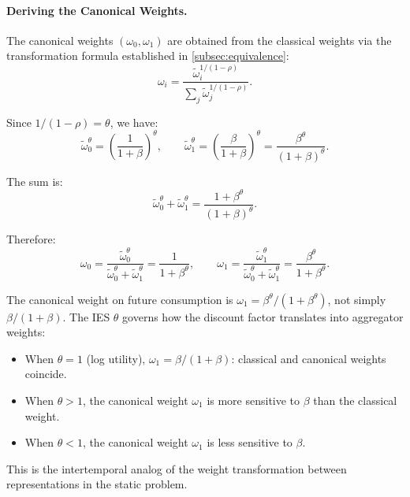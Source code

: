 \paragraph{Deriving the Canonical Weights.}
The canonical weights $(\omega_0, \omega_1)$ are obtained from the classical weights via the transformation formula established in \cref{subsec:equivalence}:
\begin{equation}
\omega_i = \frac{\tilde{\omega}_i^{1/(1-\rho)}}{\sum_{j} \tilde{\omega}_j^{1/(1-\rho)}}.
\label{eq:weight-transform-inter}
\end{equation}

Since $1/(1-\rho) = \theta$, we have:
\begin{equation}
\tilde{\omega}_0^{\theta} = \left( \frac{1}{1+\beta} \right)^{\theta}, \qquad \tilde{\omega}_1^{\theta} = \left( \frac{\beta}{1+\beta} \right)^{\theta} = \frac{\beta^{\theta}}{(1+\beta)^{\theta}}.
\label{eq:weight-transform-calc}
\end{equation}

The sum is:
\begin{equation}
\tilde{\omega}_0^{\theta} + \tilde{\omega}_1^{\theta} = \frac{1 + \beta^{\theta}}{(1+\beta)^{\theta}}.
\label{eq:weight-sum}
\end{equation}

Therefore:
\begin{equation}
\omega_0 = \frac{\tilde{\omega}_0^{\theta}}{\tilde{\omega}_0^{\theta} + \tilde{\omega}_1^{\theta}} = \frac{1}{1 + \beta^{\theta}}, \qquad \omega_1 = \frac{\tilde{\omega}_1^{\theta}}{\tilde{\omega}_0^{\theta} + \tilde{\omega}_1^{\theta}} = \frac{\beta^{\theta}}{1 + \beta^{\theta}}.
\label{eq:canonical-weights-final}
\end{equation}

\begin{calloutnote}
The canonical weight on future consumption is $\omega_1 = \beta^{\theta}/(1+\beta^{\theta})$, not simply $\beta/(1+\beta)$. The IES $\theta$ governs how the discount factor translates into aggregator weights:
\begin{itemize}[nosep]
\item When $\theta = 1$ (log utility), $\omega_1 = \beta/(1+\beta)$: classical and canonical weights coincide.
\item When $\theta > 1$, the canonical weight $\omega_1$ is more sensitive to $\beta$ than the classical weight.
\item When $\theta < 1$, the canonical weight $\omega_1$ is less sensitive to $\beta$.
\end{itemize}
This is the intertemporal analog of the weight transformation between representations in the static problem.
\end{calloutnote}

